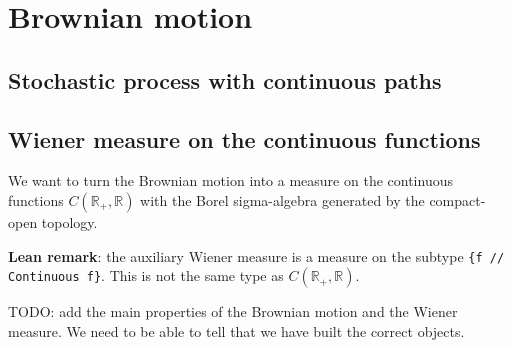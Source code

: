 \chapter{Brownian motion}
\label{chap:brownian}


\section{Stochastic process with continuous paths}











































\section{Wiener measure on the continuous functions}

We want to turn the Brownian motion into a measure on the continuous functions $C(\mathbb{R}_+, \mathbb{R})$ with the Borel sigma-algebra generated by the compact-open topology.



\textbf{Lean remark}: the auxiliary Wiener measure is a measure on the subtype \texttt{\{f  // Continuous f\}}. This is not the same type as $C(\mathbb{R}_+, \mathbb{R})$.










TODO: add the main properties of the Brownian motion and the Wiener measure.
We need to be able to tell that we have built the correct objects.
